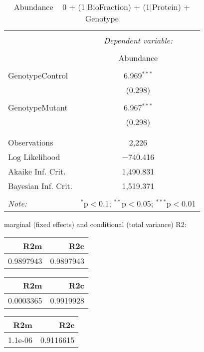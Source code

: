 \documentclass[11pt]{report}
\begin{document}
\begin{table}[!htbp] \centering 
  \caption{Abundance ~ 0 + (1|BioFraction) + (1|Protein) + Genotype} 
  \label{} 
\begin{tabular}{@{\extracolsep{5pt}}lc} 
\\[-1.8ex]\hline 
\hline \\[-1.8ex] 
 & \multicolumn{1}{c}{\textit{Dependent variable:}} \\ 
\cline{2-2} 
\\[-1.8ex] & Abundance \\ 
\hline \\[-1.8ex] 
 GenotypeControl & 6.969$^{***}$ \\ 
  & (0.298) \\ 
  & \\ 
 GenotypeMutant & 6.967$^{***}$ \\ 
  & (0.298) \\ 
  & \\ 
\hline \\[-1.8ex] 
Observations & 2,226 \\ 
Log Likelihood & $-$740.416 \\ 
Akaike Inf. Crit. & 1,490.831 \\ 
Bayesian Inf. Crit. & 1,519.371 \\ 
\hline 
\hline \\[-1.8ex] 
\textit{Note:}  & \multicolumn{1}{r}{$^{*}$p$<$0.1; $^{**}$p$<$0.05; $^{***}$p$<$0.01} \\ 
\end{tabular} 
\end{table} 
marginal (fixed effects) and conditional (total variance) R2:

\begin{tabular}{r|r}
\hline
R2m & R2c\\
\hline
0.9897943 & 0.9897943\\
\hline
\end{tabular}

\begin{tabular}{r|r}
\hline
R2m & R2c\\
\hline
0.0003365 & 0.9919928\\
\hline
\end{tabular}

\begin{tabular}{r|r}
\hline
R2m & R2c\\
\hline
1.1e-06 & 0.9116615\\
\hline
\end{tabular}
\end{document}
